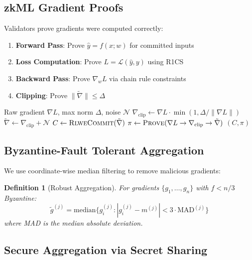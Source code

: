 \documentclass[11pt,a4paper]{article}
\newtheorem{definition}[theorem]{Definition}
\begin{document}
\subsection{zkML Gradient Proofs}

Validators prove gradients were computed correctly:

\begin{enumerate}
    \item \textbf{Forward Pass}: Prove $\hat{y} = f(x; w)$ for committed inputs
    \item \textbf{Loss Computation}: Prove $L = \mathcal{L}(\hat{y}, y)$ using R1CS
    \item \textbf{Backward Pass}: Prove $\nabla_w L$ via chain rule constraints
    \item \textbf{Clipping}: Prove $\|\tilde{\nabla}\| \leq \Delta$
\end{enumerate}

\begin{algorithm}
\caption{Gradient Proof Generation}
\begin{algorithmic}[1]
\Require Raw gradient $\nabla L$, max norm $\Delta$, noise $\mathcal{N}$
\State $\nabla_{\text{clip}} \gets \nabla L \cdot \min(1, \Delta / \|\nabla L\|)$
\State $\tilde{\nabla} \gets \nabla_{\text{clip}} + \mathcal{N}$
\State $C \gets \textsc{RlweCommit}(\tilde{\nabla})$ 
\State $\pi \gets \textsc{Prove}(\nabla L \to \nabla_{\text{clip}} \to \tilde{\nabla})$
\State \Return $(C, \pi)$
\end{algorithmic}
\end{algorithm}

\subsection{Byzantine-Fault Tolerant Aggregation}

We use coordinate-wise median filtering to remove malicious gradients:

\begin{definition}[Robust Aggregation]
For gradients $\{g_1, \ldots, g_n\}$ with $f < n/3$ Byzantine:
\begin{equation}
\tilde{g}^{(j)} = \text{median}\{g_i^{(j)} : |g_i^{(j)} - m^{(j)}| < 3 \cdot \text{MAD}^{(j)}\}
\end{equation}
where MAD is the median absolute deviation.
\end{definition}

\subsection{Secure Aggregation via Secret Sharing}
\end{document}
